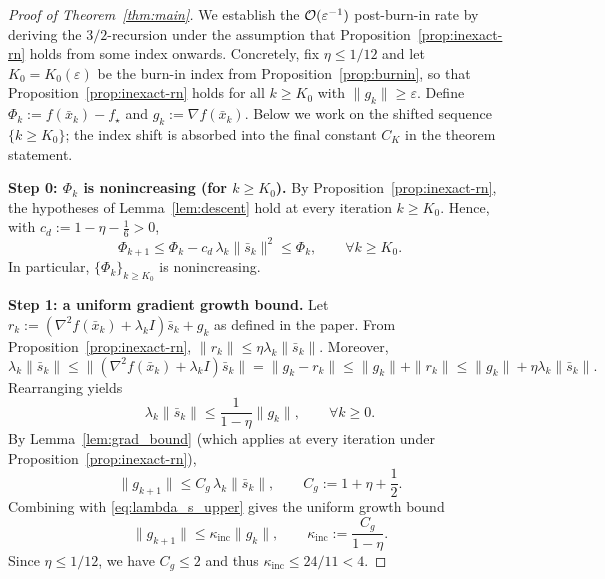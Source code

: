 \documentclass[review,onefignum,onetabnum]{siamart171218}
\begin{document}
\begin{proof}[Proof of Theorem~\ref{thm:main}]
We establish the $\mathcal{O}(\varepsilon^{-1})$ post-burn-in rate
by deriving the $3/2$-recursion under the assumption that
Proposition~\ref{prop:inexact-rn} holds from some index onwards.
Concretely, fix $\eta\le 1/12$ and let $K_0=K_0(\varepsilon)$ be
the burn-in index from Proposition~\ref{prop:burnin}, so that
Proposition~\ref{prop:inexact-rn} holds for all $k\ge K_0$ with
$\|g_k\|\ge\varepsilon$.
Define $\Phi_k:=f(\bar x_k)-f_\star$ and $g_k:=\nabla f(\bar x_k)$.
Below we work on the shifted sequence $\{k\ge K_0\}$; the
index shift is absorbed into the final constant $C_K$ in the
theorem statement.

\smallskip
\noindent\textbf{Step 0: $\Phi_k$ is nonincreasing (for $k\ge K_0$).}
By Proposition~\ref{prop:inexact-rn}, the hypotheses of Lemma~\ref{lem:descent} hold at every iteration $k\ge K_0$.
Hence, with $c_d:=1-\eta-\frac16>0$,
\begin{equation}\label{eq:Phi_monotone}
\Phi_{k+1}\le \Phi_k - c_d\,\lambda_k\|\bar s_k\|^2\le \Phi_k,
\qquad \forall k\ge K_0.
\end{equation}
In particular, $\{\Phi_k\}_{k\ge K_0}$ is nonincreasing.

\smallskip
\noindent\textbf{Step 1: a uniform gradient growth bound.}
Let $r_k:=(\nabla^2 f(\bar x_k)+\lambda_k I)\bar s_k+g_k$ as defined in the paper.
From Proposition~\ref{prop:inexact-rn}, $\|r_k\|\le \eta\lambda_k\|\bar s_k\|$.
Moreover,
\[
\lambda_k\|\bar s_k\|
\le \|(\nabla^2 f(\bar x_k)+\lambda_k I)\bar s_k\|
=\|g_k-r_k\|
\le \|g_k\|+\|r_k\|
\le \|g_k\|+\eta\lambda_k\|\bar s_k\|.
\]
Rearranging yields
\begin{equation}\label{eq:lambda_s_upper}
\lambda_k\|\bar s_k\|\le \frac{1}{1-\eta}\|g_k\|,\qquad \forall k\ge 0.
\end{equation}
By Lemma~\ref{lem:grad_bound} (which applies at every iteration under Proposition~\ref{prop:inexact-rn}),
\[
\|g_{k+1}\|\le C_g\,\lambda_k\|\bar s_k\|,
\qquad
C_g:=1+\eta+\frac12.
\]
Combining with \eqref{eq:lambda_s_upper} gives the uniform growth bound
\begin{equation}\label{eq:grad_growth}
\|g_{k+1}\|\le \kappa_{\mathrm{inc}}\|g_k\|,
\qquad
\kappa_{\mathrm{inc}}:=\frac{C_g}{1-\eta}.
\end{equation}
Since $\eta\le 1/12$, we have $C_g\le 2$ and thus $\kappa_{\mathrm{inc}}\le 24/11<4$.


\end{proof}
\end{document}
